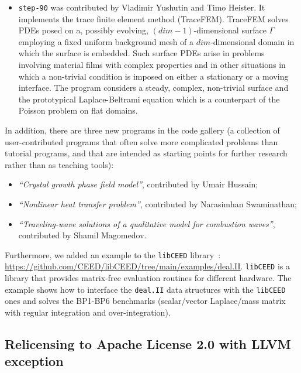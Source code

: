 \documentclass{ansarticle-preprint}
\newcommand{\specialword}[1]{\texttt{#1}}
\newcommand{\dealii}{{\specialword{deal.II}}\xspace}
\newcommand{\step}[1]{{\specialword{step-#1}}\xspace}
\begin{document}
\begin{itemize}
    within matrix-free loops in \dealii.
  \item
    \step{90} was contributed by Vladimir Yushutin and Timo Heister.
    It implements the trace finite element method (TraceFEM). TraceFEM solves PDEs
    posed on a, possibly evolving, $(dim-1)$-dimensional surface $\Gamma$ employing
    a fixed uniform background mesh of a $dim$-dimensional domain in which
    the surface is embedded. Such surface PDEs arise in problems involving
    material films with complex properties and in other situations in which
    a non-trivial condition is imposed on either a stationary or a moving interface.
    The program considers a steady, complex, non-trivial surface and the prototypical
    Laplace-Beltrami equation which is a counterpart of
    the Poisson problem on flat domains.
\end{itemize}

In addition, there are three new programs in the code gallery (a collection of
user-contributed programs that often solve more complicated problems
than tutorial programs, and that are intended as starting points for further
research rather than as teaching tools):
\begin{itemize}
  \item \emph{``Crystal growth phase field model''},
    contributed by Umair Hussain;
  \item \emph{``Nonlinear heat transfer problem''}, contributed by
    Narasimhan Swaminathan;
  \item \emph{``Traveling-wave solutions of a qualitative model for combustion waves''}, contributed by
    Shamil Magomedov.
\end{itemize}

Furthermore, we added an example to the \texttt{libCEED}
library~\cite{brown2021libceed}:
\url{https://github.com/CEED/libCEED/tree/main/examples/deal.II}.
\texttt{libCEED} is a library that provides matrix-free evaluation routines
for different hardware. The example shows how to interface the \dealii{}
data structures with the \texttt{libCEED} ones and solves the BP1-BP6
benchmarks (scalar/vector Laplace/mass matrix with regular integration and
over-integration).


\subsection{Relicensing to Apache License 2.0 with LLVM exception}
\label{sec:license}
\end{document}
